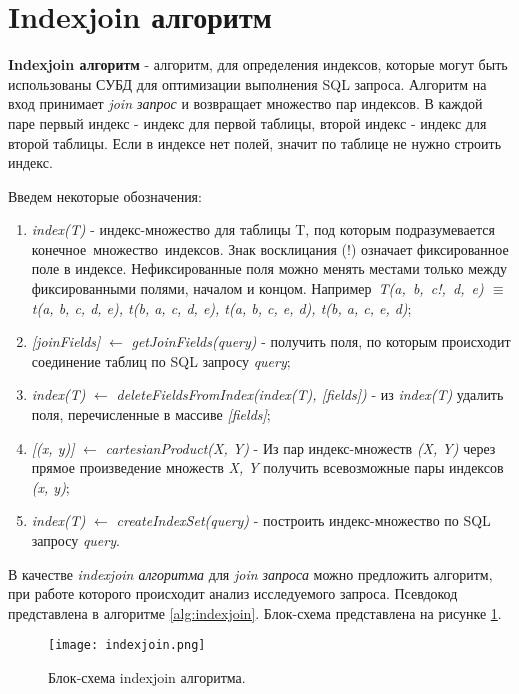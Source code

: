 \section{Indexjoin алгоритм}

\textbf{Indexjoin алгоритм} - алгоритм, для определения индексов, которые могут быть использованы СУБД для оптимизации выполнения SQL запроса. Алгоритм на вход принимает \textit{join запрос} и возвращает множество пар индексов. В каждой паре первый индекс - индекс для первой таблицы, второй индекс - индекс для второй таблицы. Если в индексе нет полей, значит по таблице не нужно строить индекс. 

Введем некоторые обозначения:
\begin{enumerate}
\item \textit{index(T)} - индекс-множество для таблицы T, под которым подразумевается конечное множество индексов. Знак восклицания (!) означает фиксированное поле в индексе. Нефиксированные поля можно менять местами только между фиксированными полями, началом и концом. Например \textit{T(a, b, c!, d, e) $\equiv$ t(a, b, c, d, e), t(b, a, c, d, e), t(a, b, c, e, d), t(b, a, c, e, d)};

\item \textit{[joinFields]} $\gets$ \textit{getJoinFields(query)} - получить поля, по которым происходит соединение таблиц по SQL запросу \textit{query};

\item \textit{index(T)} $\gets$ \textit{deleteFieldsFromIndex(index(T), [fields])} - из \textit{index(T)}  удалить поля, перечисленные в массиве \textit{[fields]};

\item  \textit{[(x, y)]} $\gets$ \textit{cartesianProduct(X, Y)} - Из пар индекс-множеств \textit{(X, Y)} через прямое произведение множеств \textit{X, Y} получить всевозможные пары индексов \textit{(x, y)};

\item \textit{index(T)} $\gets$ \textit{createIndexSet(query)} - построить индекс-множество по SQL запросу \textit{query}.
\end{enumerate}

В качестве \textit{indexjoin алгоритма} для \textit{join запроса} можно предложить алгоритм, при работе которого происходит анализ исследуемого запроса. Псевдокод представлена в алгоритме \ref{alg:indexjoin}. Блок-схема представлена на рисунке \ref{img:indexjoin}.

\begin{figure}[h]
  \centering
  \texttt{[image: indexjoin.png]}
  \caption{Блок-схема indexjoin алгоритма.}
  \label{img:indexjoin}
\end{figure}

